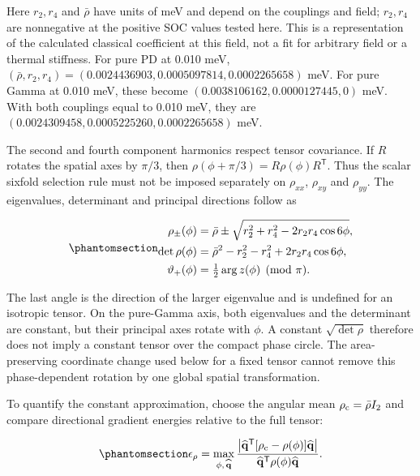 Here \(r_2,r_4\) and \(\bar\rho\) have units of meV and depend on the
couplings and field; \(r_2,r_4\) are nonnegative at the positive SOC
values tested here. This is a representation of the calculated classical
coefficient at this field, not a fit for arbitrary field or a thermal
stiffness. For pure PD at 0.010 meV,
\((\bar\rho,r_2,r_4)=(0.0024436903,0.0005097814,0.0002265658)\) meV. For
pure Gamma at 0.010 meV, these become \((0.0038106162,0.0000127445,0)\)
meV. With both couplings equal to 0.010 meV, they are
\((0.0024309458,0.0005225260,0.0002265658)\) meV.

The second and fourth component harmonics respect tensor covariance. If
\(R\) rotates the spatial axes by \(\pi/3\), then
\(\rho(\phi+\pi/3)=R\rho(\phi)R^{\mathsf T}\). Thus the scalar sixfold
selection rule must not be imposed separately on \(\rho_{xx}\),
\(\rho_{xy}\) and \(\rho_{yy}\). The eigenvalues, determinant and
principal directions follow as

\begin{equation}\phantomsection\label{eq-nbcp-y-angular-invariants}{
\begin{aligned}
\rho_\pm(\phi)&=\bar\rho\pm\sqrt{r_2^2+r_4^2-2r_2r_4\cos6\phi},\\
\det\rho(\phi)&=\bar\rho^2-r_2^2-r_4^2+2r_2r_4\cos6\phi,\\
\vartheta_+(\phi)&=\tfrac12\arg z(\phi)\pmod\pi.
\end{aligned}
}\end{equation}

The last angle is the direction of the larger eigenvalue and is
undefined for an isotropic tensor. On the pure-Gamma axis, both
eigenvalues and the determinant are constant, but their principal axes
rotate with \(\phi\). A constant \(\sqrt{\det\rho}\) therefore does not
imply a constant tensor over the compact phase circle. The
area-preserving coordinate change used below for a fixed tensor cannot
remove this phase-dependent rotation by one global spatial
transformation.

To quantify the constant approximation, choose the angular mean
\(\rho_{\rm c}=\bar\rho I_2\) and compare directional gradient energies
relative to the full tensor:

\begin{equation}\phantomsection\label{eq-nbcp-y-angular-gradient-error}{
\epsilon_\rho=\max_{\phi,\,\widehat{\mathbf q}}
\frac{\left|\widehat{\mathbf q}^{\mathsf T}
[\rho_{\rm c}-\rho(\phi)]\widehat{\mathbf q}\right|}
{\widehat{\mathbf q}^{\mathsf T}\rho(\phi)\widehat{\mathbf q}}.
}\end{equation}

